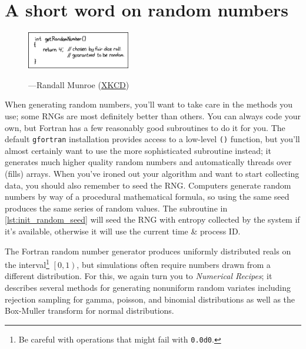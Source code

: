 \chapter{A short word on random numbers}
\label{chap:Random numbers}
\begin{figure}[h!]
  \centering
  \includegraphics[width=0.4\textwidth]{figures/random_number.png}

  \hspace*{\fill}---Randall Munroe (\href{http://xkcd.com/221/}{XKCD})
\end{figure}
When generating random numbers, you'll want to take care in the methods you use; some RNGs are most definitely better than others.
You can always code your own, but Fortran has a few reasonably good subroutines to do it for you.
The default \texttt{gfortran} installation provides access to a low-level \texttt{()} function, but you'll almost certainly want to use the more sophisticated  subroutine instead; it generates much higher quality random numbers and automatically threads over (fills) arrays.
When you've ironed out your algorithm and want to start collecting data, you should also remember to seed the RNG.
Computers generate random numbers by way of a procedural mathematical formula, so using the same seed produces the same series of random values.
The subroutine in \autoref{lst:init_random_seed} will seed the RNG with entropy collected by the system if it's available, otherwise it will use the current time \& process ID.


The Fortran random number generator produces uniformly distributed reals on the interval\footnote{Be careful with operations that might fail with \texttt{0.0d0}.} $\left[0, 1\right)$, but simulations often require numbers drawn from a different distribution. 
  For this, we again turn you to \emph{Numerical Recipes}; it describes several methods for generating nonuniform random variates including rejection sampling for gamma, poisson, and binomial distributions as well as the Box-Muller transform for normal distributions. 
